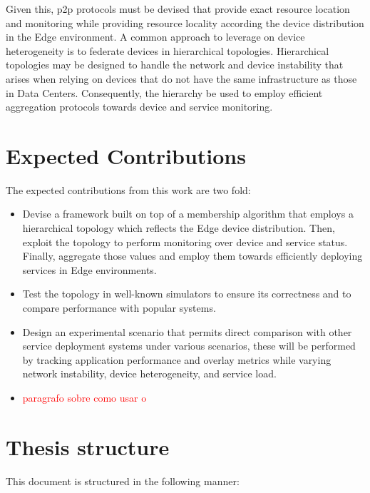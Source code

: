 Given this, p2p protocols must be devised that provide exact resource location and monitoring while providing resource locality according the device distribution in the Edge environment. A common approach to leverage on device heterogeneity is to federate devices in hierarchical topologies. Hierarchical topologies may be designed to handle the network and device instability that arises when relying on devices that do not have the same infrastructure as those in Data Centers. Consequently, the hierarchy be used to employ efficient aggregation protocols towards device and service monitoring.

\section{Expected Contributions}

The expected contributions from this work are two fold:

\begin{itemize}

    \item Devise a framework built on top of a membership algorithm that employs a hierarchical topology which reflects the Edge device distribution. Then, exploit the topology to perform monitoring over device and service status. Finally, aggregate those values and employ them towards efficiently deploying services in Edge environments.
    
    \item Test the topology in well-known simulators to ensure its correctness and to compare performance with popular systems.

    \item Design an experimental scenario that permits direct comparison with other service deployment systems under various scenarios, these will be performed by tracking application performance and overlay metrics while varying network instability, device heterogeneity, and service load. 

    \item \textcolor{red}{paragrafo sobre como usar o }
    
\end{itemize}

\section{Thesis structure}

This document is structured in the following manner:

